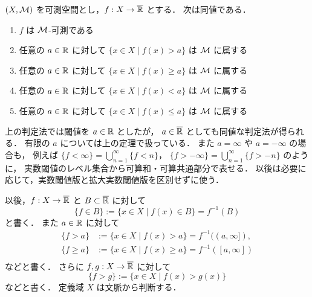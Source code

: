 \begin{theorem}[可測関数の判定法]\label{thm:lebesgue-measurable-function-criterion}
$(X,\mathcal M)$ を可測空間とし，$f:X\to\overline{\mathbb R}$ とする．
次は同値である．
\begin{enumerate}
    \item $f$ は $\mathcal M$-可測である
    \item 任意の $a\in\mathbb R$ に対して
    $\{x\in X \mid f(x)>a\}$
    は $\mathcal M$ に属する
    \item 任意の $a\in\mathbb R$ に対して
    $\{x\in X \mid f(x)\ge a\}$
    は $\mathcal M$ に属する
    \item 任意の $a\in\mathbb R$ に対して
    $\{x\in X \mid f(x)<a\}$
    は $\mathcal M$ に属する
    \item 任意の $a\in\mathbb R$ に対して
    $\{x\in X \mid f(x)\le a\}$
    は $\mathcal M$ に属する
\end{enumerate}
\end{theorem}

\begin{remark}[拡大実数の閾値]
上の判定法では閾値を $a\in\mathbb R$ としたが，
$a\in\overline{\mathbb R}$ としても同値な判定法が得られる．
有限の $a$ については上の定理で扱っている．
また $a=\infty$ や $a=-\infty$ の場合も，
例えば $\{f<\infty\}=\bigcup_{n=1}^{\infty}\{f<n\}$，
$\{f>-\infty\}=\bigcup_{n=1}^{\infty}\{f>-n\}$ のように，
実数閾値のレベル集合から可算和・可算共通部分で表せる．
以後は必要に応じて，実数閾値版と拡大実数閾値版を区別せずに使う．
\end{remark}

\begin{remark}[レベル集合の略記]\label{rem:level-set-notation}
以後，$f:X\to\overline{\mathbb R}$ と $B\subset\overline{\mathbb R}$ に対して
\[
\{f\in B\}:=\{x\in X\mid f(x)\in B\} = f^{-1}(B)
\]
と書く．
また $a\in\mathbb R$ に対して
\[
\begin{aligned}
\{f>a\} &:=\{x\in X\mid f(x)>a\} = f^{-1}( (a,\infty] ),\\
\{f\ge a\}&:=\{x\in X\mid f(x)\ge a\} = f^{-1}( [a,\infty] )\\
\end{aligned}
\]
などと書く．
さらに $f,g:X\to\overline{\mathbb R}$ に対して
\[
\{f>g\}:=\{x\in X\mid f(x)>g(x)\}
\]
などと書く．
定義域 $X$ は文脈から判断する．
\end{remark}

